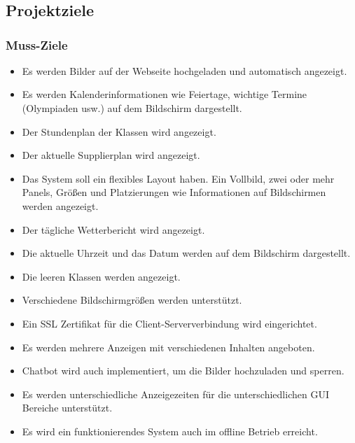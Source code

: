 \chapter{\docname}
\label{\docname}

\section{Projektziele}
\subsection{Muss-Ziele}

\begin{itemize}
	
	
	\item Es werden Bilder auf der Webseite hochgeladen und automatisch angezeigt.  
	
	\item Es werden Kalenderinformationen wie Feiertage, wichtige Termine (Olympiaden usw.) auf dem Bildschirm dargestellt.  
	
	\item Der Stundenplan der Klassen wird angezeigt.   
	
	\item Der aktuelle Supplierplan wird angezeigt.   
	
	\item Das System soll ein flexibles Layout haben. Ein Vollbild, zwei oder mehr Panels, Gr\"{o}\ss{}en und Platzierungen wie Informationen auf Bildschirmen werden angezeigt.  
	
	\item Der t\"{a}gliche Wetterbericht wird angezeigt.   
	
	\item Die aktuelle Uhrzeit und das Datum werden auf dem Bildschirm dargestellt.   
	
	\item Die leeren Klassen werden angezeigt.   
	
	\item Verschiedene Bildschirmgr\"{o}\ss{}en werden unterst\"{u}tzt.  
	
	\item Ein SSL Zertifikat f\"{u}r die Client-Serververbindung wird eingerichtet.   
	
	\item Es werden mehrere Anzeigen mit verschiedenen Inhalten angeboten.  
	
	\item Chatbot wird auch implementiert, um die Bilder hochzuladen und sperren.  
	
	\item Es werden unterschiedliche Anzeigezeiten f\"{u}r die unterschiedlichen GUI Bereiche unterst\"{u}tzt.  
	
	\item Es wird ein funktionierendes System auch im offline Betrieb erreicht. 
	
\end{itemize}

